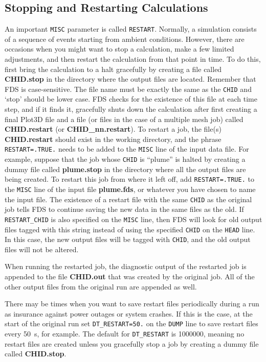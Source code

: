 \documentclass[11pt]{book}
\newcommand{\ct}{\tt\small}
\begin{document}
\subsection{Stopping and Restarting Calculations}
\label{info:restart}

An important {\ct MISC} parameter is called {\ct RESTART}. Normally, a simulation consists of a sequence of events
starting from ambient conditions. However, there are occasions
when you might want to stop a calculation, make a few
limited adjustments, and then
restart the calculation from that point in time. To do this,
first bring the calculation to a halt gracefully by creating a file
called {\bf CHID.stop}
in the directory where the output files are located. Remember that
FDS is case-sensitive. The file name must be exactly the same as
the {\ct CHID} and `stop' should be lower case. FDS checks for the
existence of this file at each time step, and if it finds it, gracefully
shuts down the calculation after first creating a final Plot3D
file and a file (or files in the case of a multiple mesh job)
called {\bf CHID.restart} (or {\bf CHID\_nn.restart}).
To restart a job, the file(s) {\bf CHID.restart} should exist in
the working directory, and
the phrase {\ct RESTART=.TRUE.} needs to be added
to the {\ct MISC} line of the input data file.
For example, suppose that the job
whose {\ct CHID} is ``plume'' is halted by creating a
dummy file called {\bf plume.stop} in the directory where
all the output files are being created. To restart this job from where it
left off, add {\ct RESTART=.TRUE.} to the {\ct MISC} line
of the input file {\bf plume.fds}, or whatever you have chosen to
name the input file. The existence of a restart file with the same
{\ct CHID} as the original job tells FDS
to continue saving the new data in the same files as the old.  If {\ct RESTART\_CHID} is also specified on the
{\ct MISC} line, then FDS will look for old output files tagged with this string instead of using the specified
{\ct CHID} on the {\ct HEAD} line. In this case, the new output files will be tagged with {\ct CHID}, and the
old output files will not be altered.

When running the restarted job, the diagnostic
output of the restarted job is appended to the file {\bf CHID.out} that was created by
the original job.
All of the other output files from the original run are appended as well.

There may be times when you want to save restart files periodically
during a run as insurance against power outages or system crashes.
If this is the case, at the start of the original run
set {\ct DT\_RESTART=50.} on the {\ct DUMP} line to save restart files
every 50~s, for example.
The default for {\ct DT\_RESTART} is 1000000, meaning no restart files are
created unless you gracefully stop a job by
creating a dummy file called {\bf CHID.stop}.
\end{document}
